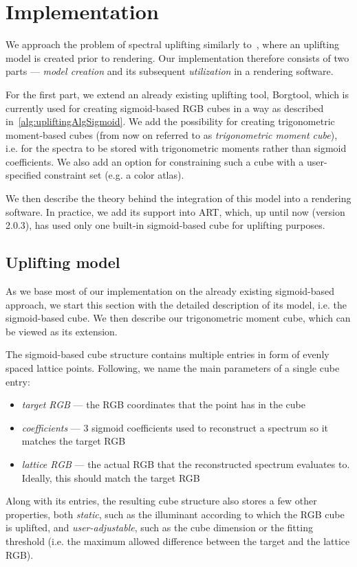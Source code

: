 \chapter{Implementation} \label{chap:implementation}

We approach the problem of spectral uplifting similarly to~\citet{upsamplingJakobHanika}, where an uplifting model is created prior to rendering. Our implementation therefore consists of two parts --- \emph{model creation} and its subsequent \emph{utilization} in a rendering software. 

For the first part, we extend an already existing uplifting tool, Borgtool, which is currently used for creating sigmoid-based RGB cubes in a way as described in~\cref{alg:upliftingAlgSigmoid}. We add the possibility for creating trigonometric moment-based cubes (from now on referred to as \emph{trigonometric moment cube}), i.e. for the spectra to be stored with trigonometric moments rather than sigmoid coefficients. We also add an option for constraining such a cube with a user-specified constraint set (e.g. a color atlas).

We then describe the theory behind the integration of this model into a rendering software. In practice, we add its support into ART, which, up until now (version 2.0.3), has used only one built-in sigmoid-based cube for uplifting purposes.

\section{Uplifting model}

As we base most of our implementation on the already existing sigmoid-based approach, we start this section with the detailed description of its model, i.e. the sigmoid-based cube. We then describe our trigonometric moment cube, which can be viewed as its extension.

The sigmoid-based cube structure contains multiple entries in form of evenly spaced lattice points. Following, we name the main parameters of a single cube entry:
\begin{itemize}
	\item \emph{target RGB} --- the RGB coordinates that the point has in the cube
	\item \emph{coefficients} --- 3 sigmoid coefficients used to reconstruct a spectrum so it matches the target RGB
	\item \emph{lattice RGB} --- the actual RGB that the reconstructed spectrum evaluates to. Ideally, this should match the target RGB
\end{itemize}
Along with its entries, the resulting cube structure also stores a few other properties, both \emph{static}, such as the illuminant according to which the RGB cube is uplifted, and \emph{user-adjustable}, such as the cube dimension or the fitting threshold (i.e. the maximum allowed difference between the target and the lattice RGB).

